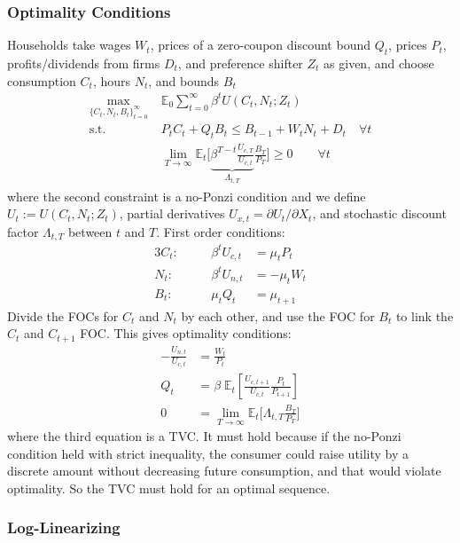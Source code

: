 \documentclass[12pt]{article}
\theoremstyle{plain}
\theoremstyle{definition}
\theoremstyle{remark}
\newcommand{\limT}{\lim_{T\rightarrow\infty}}
\newcommand{\E}{\mathbb{E}}
\newcommand{\sumtinfz}{\sum^\infty_{t=0}}
\newcommand{\tinfz}{^\infty_{t=0}}
\begin{document}
\subsubsection{Optimality Conditions}

Households take wages $W_t$, prices of a zero-coupon discount bound
$Q_t$, prices $P_t$, profits/dividends from firms $D_t$, and preference
shifter $Z_t$ as given, and choose consumption $C_t$, hours $N_t$, and
bounds $B_t$
\begin{align*}
  \max_{\{C_t,N_t,B_t\}\tinfz} \;
  &\E_0\sumtinfz \beta^t U(C_t,N_t;Z_t) \\
  \text{s.t.}\quad&
  P_tC_t + Q_{t}B_t \leq B_{t-1} + W_tN_t + D_t\quad \forall t\\
  &\limT \E_t\bigg[
    \underbrace{\beta^{T-t} \frac{U_{c,T}}{U_{c,t}}}_{\Lambda_{t,T}}
    \frac{B_T}{P_T}
  \bigg]
  \geq 0
  \qquad \forall t
\end{align*}
where the second constraint is a no-Ponzi condition and
we define $U_t:=U(C_t,N_t;Z_t)$, partial derivatives
$U_{x,t}=\partial U_t/\partial X_t$, and stochastic discount factor
$\Lambda_{t,T}$ between $t$ and $T$.
First order conditions:
\begin{alignat*}{3}
  C_t:&&\quad
  \beta^t U_{c,t} &= \mu_t P_t
  \\
  N_t:&&\quad
  \beta^t U_{n,t} &= -\mu_t W_t
  \\
  B_t:&&\quad
  \mu_t Q_t &= \mu_{t+1}
\end{alignat*}
Divide the FOCs for $C_t$ and $N_t$ by each other, and use the FOC for
$B_t$ to link the $C_t$ and $C_{t+1}$ FOC. This gives optimality
conditions:
\begin{align*}
  -\frac{U_{n,t}}{U_{c,t}}
  &=
  \frac{W_t}{P_{t}} \\
  Q_t &=
  \beta\;
  \E_t\left[
    \frac{U_{c,t+1}}{U_{c,t}}
    \frac{P_t}{P_{t+1}}
  \right]
  \\
  0 &=
  \limT \E_t\bigg[
    \Lambda_{t,T}
    \frac{B_T}{P_T}
  \bigg]
\end{align*}
where the third equation is a TVC. It must hold because if the no-Ponzi
condition held with strict inequality, the consumer could raise
utility by a discrete amount without decreasing future consumption, and
that would violate optimality. So the TVC must hold for an optimal
sequence.

\clearpage
\subsubsection{Log-Linearizing}
\end{document}
